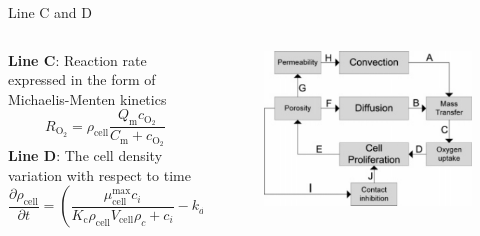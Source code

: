 \documentclass[11pt,t]{beamer}
\begin{document}
\begin{frame}[fragile]{Line C and D}  

	\begin{columns}[t]
		\begin{column}{.75\textwidth}
\textbf{Line C}: Reaction rate expressed in the form of Michaelis-Menten kinetics
\[
R _ { \mathrm { O } _ { 2 } } = \rho _ { \mathrm { cell } } \frac { Q _ { \mathrm { m } } c _ { \mathrm { O } _ { 2 } } } { C _ { \mathrm { m } } + c _ { \mathrm { O } _ { 2 } } }
\]
\textbf{Line D}: The cell density
variation with respect to time
\[
\frac { \partial \rho _ { \mathrm { cell } } } { \partial t } = \left( \frac { \mu _ { \mathrm { cell } } ^ { \max } c _ { i } } { K _ { \mathrm { c } } \rho _ { \mathrm { cell } } V _ { \mathrm { cell } } \rho _ { c } + c _ { i } } - k _ { d } \right) \rho _ { \mathrm { cell } }
\]

		\end{column}
		\begin{column}{.25\textwidth}
			
			\begin{figure}
			\centering
			\includegraphics[width=\textwidth]{math_scheme}
			
			\end{figure}
		\end{column}
	\end{columns}	
		
\end{frame}
\end{document}
